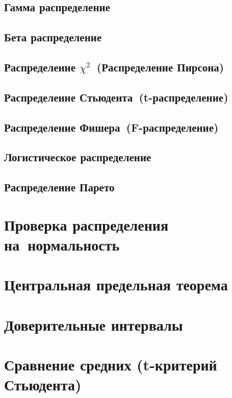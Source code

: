 \documentclass[]{scrartcl}
\begin{document}
\subsection{Гамма распределение}

\subsection{Бета распределение}

\subsection{Распределение $\chi ^ 2$~(Распределение Пирсона)}

\subsection{Распределение Стьюдента~(t-распределение)}

\subsection{Распределение Фишера~(F-распределение)}

\subsection{Логистическое распределение}

\subsection{Распределение Парето}

\section{Проверка распределения на~нормальность}

\section{Центральная предельная теорема}

\section{Доверительные интервалы}

\section{Сравнение средних (t-критерий Стьюдента)}
\end{document}
